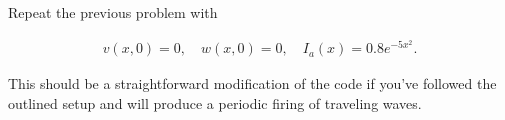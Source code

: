 \documentclass[12pt]{report}
\begin{document}
\newpage



\begin{problem}
    Repeat the previous problem with

\begin{align*}
    v(x,0) = 0, \quad w(x,0) = 0, \quad I_a(x) = 0.8 e^{-5x^2}.
\end{align*}

This should be a straightforward modification of the code if you've followed the outlined setup and will produce a periodic firing of traveling waves.
\end{problem}
\end{document}

